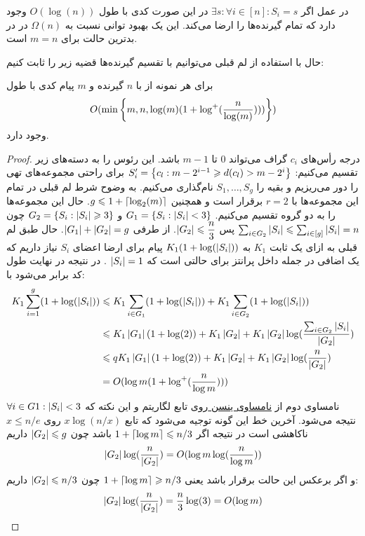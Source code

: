 \begin{remark}
    در عمل اگر
    $\exists s: \forall i \in [n]: S_i = s$
    در این صورت کدی با طول
    $O(\log(n))$
    وجود دارد که تمام گیرنده‌ها را ارضا می‌کند. این یک بهبود توانی نسبت به
    $\Omega(n)$
    در
    \icod
    در بدترین حالت برای
    $m = n$
    است.
\end{remark}

حال با استفاده از لم قبلی می‌توانیم با تقسیم گیرنده‌ها قضیه زیر را ثابت کنیم:
\begin{theorem}
    \label{theorem:log1}
    برای هر نمونه از
    با
    $n$
    گیرنده و
    $m$
    پیام کدی با طول
    $$O(\min\left\{ m, n, \log(m)(1 + \log^{+}(\dfrac{n}{\log(m)}) )) \right\})$$
    وجود دارد.
\end{theorem}
\begin{proof}
    درجه رأس‌های
    $c_i$
    گراف می‌تواند
    $0$
    تا
    $m - 1$
    باشد. این رئوس را به دسته‌های زیر تقسیم می‌کنیم:
    $S_{i}' = \left\{ c_l: m - 2^{i - 1} \geqslant d(c_l) > m - 2^i \right\}$
    برای راحتی مجموعه‌های تهی را دور می‌ریزیم و بقیه را
    $S_1, \ldots, S_g$
    نام‌گذاری می‌کنیم. به وضوح شرط لم قبلی در تمام این مجموعه‌ها با
    $r = 2$
    برقرار است و همچنین
    $g \leqslant 1 + \left\lceil{\log_2(m)}\right\rceil$. حال این مجموعه‌ها را به دو گروه تقسیم می‌کنیم.
    $G_1 = \left\{  S_i: \left|{S_i}\right| < 3 \right\}$
    و
    $G_2 = \left\{  S_i: \left|{S_i}\right| \geqslant 3 \right\}$
    چون
    $\sum_{i \in G_2} \left|{S_i}\right| \leqslant \sum_{i \in [g]} \left|{S_i}\right| = n$
    پس
    $\left|{G_2}\right| \leqslant \dfrac{n}{3}$. از طرفی
    $\left|{G_1}\right| + \left|{G_2}\right| = g$. حال طبق لم قبلی به ازای یک ثابت
    $K_1$
    به
    $K_1(1 + \log(\left|{S_i}\right|))$
    پیام برای ارضا اعضای
    $S_i$
    نیاز داریم که یک اضافی در جمله داخل پرانتز برای حالتی است که
    $\left|{S_i}\right| = 1$
    . در نتیجه در نهایت طول کد برابر می‌شود با:
    \begin{align}
        K_1 \sum\limits_{i = 1}^{g} (1 + \log(\left|{S_i}\right|))
        & \leqslant K_1 \sum_{i \in G_1}    (1 + \log(\left|{S_i}\right|)) + K_1 \sum_{i \in G_2} (1 + \log(\left|{S_i}\right|)) \\
        & \leqslant K_1 \left|{G_1}\right| (1 + \log(2)) + K_1 \left|{G_2}\right| + K_1 \left|{G_2}\right| \log(\dfrac{\sum_{i\in G_2} \left|{S_i}\right|}{\left|{G_2}\right|}) \\
        & \leqslant q K_1 \left|{G_1}\right| (1 + \log(2)) + K_1 \left|{G_2}\right| + K_1 \left|{G_2}\right| \log(\dfrac{n}{\left|{G_2}\right|}) \\
        & = O(\log m (1 + \log^{+}(\dfrac{n}{\log m})))
    \end{align}
    نامساوی دوم از
    \hyperref[Jensen]{
        نامساوی ینسن
    }
    روی تابع لگاریتم و این نکته که
    $\forall i \in G1: \left|{S_i}\right| < 3$
    نتیجه می‌شود. آخرین خط این گونه توجیه می‌شود که تابع
    $x \log(n/x)$
    روی
    $x \leq n/e$
    ناکاهشی است در نتیجه اگر
    $1 + \left\lceil{ \log m}\right\rceil \leqslant n/3$
    باشد چون
    $\left|{G_2}\right| \leqslant g$
    داریم
    $$\left|{G_2}\right| \log (\dfrac{n}{\left|{G_2}\right|}) = O(\log m \log (\dfrac{n}{\log m}))$$
    و اگر برعکس این حالت برقرار باشد یعنی
    $1 + \left\lceil{ \log m }\right\rceil \geqslant n/3$
    چون
    $\left|{G_2}\right| \leqslant n/3$
    داریم:
    $$\left|{G_2}\right| \log(\dfrac{n}{\left|{G_2}\right|}) = \dfrac{n}{3} \log(3) = O(\log m)$$


\end{proof}
